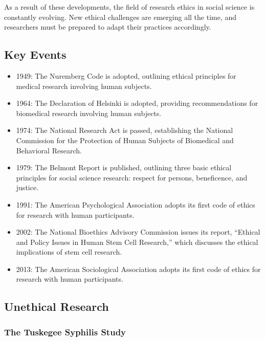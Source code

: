 \documentclass[
  b5paper]{book}
\providecommand{\tightlist}{%
  \setlength{\itemsep}{0pt}\setlength{\parskip}{0pt}}
\begin{document}
As a result of these developments, the field of research ethics in social science is constantly evolving. New ethical challenges are emerging all the time, and researchers must be prepared to adapt their practices accordingly.

\hypertarget{key-events}{%
\subsection*{Key Events}\label{key-events}}

\begin{itemize}
\tightlist
\item
  1949: The Nuremberg Code is adopted, outlining ethical principles for medical research involving human subjects.
\item
  1964: The Declaration of Helsinki is adopted, providing recommendations for biomedical research involving human subjects.
\item
  1974: The National Research Act is passed, establishing the National Commission for the Protection of Human Subjects of Biomedical and Behavioral Research.
\item
  1979: The Belmont Report is published, outlining three basic ethical principles for social science research: respect for persons, beneficence, and justice.
\item
  1991: The American Psychological Association adopts its first code of ethics for research with human participants.
\item
  2002: The National Bioethics Advisory Commission issues its report, ``Ethical and Policy Issues in Human Stem Cell Research,'' which discusses the ethical implications of stem cell research.
\item
  2013: The American Sociological Association adopts its first code of ethics for research with human participants.
\end{itemize}

\hypertarget{unethical-research}{%
\subsection*{Unethical Research}\label{unethical-research}}

\hypertarget{the-tuskegee-syphilis-study}{%
\subsubsection*{The Tuskegee Syphilis Study}\label{the-tuskegee-syphilis-study}}
\end{document}
